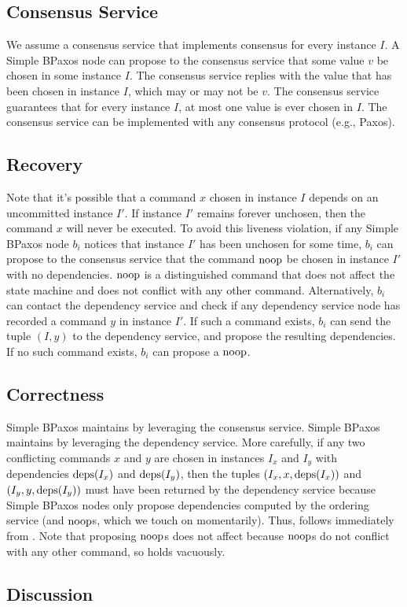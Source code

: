 \subsection{Consensus Service}
We assume a consensus service that implements consensus for every instance $I$.
A Simple BPaxos node can propose to the consensus service that some value $v$
be chosen in some instance $I$. The consensus service replies with the value
that has been chosen in instance $I$, which may or may not be $v$. The
consensus service guarantees that for every instance $I$, at most one value is
ever chosen in $I$. The consensus service can be implemented with any consensus
protocol (e.g., Paxos).

\subsection{Recovery}
Note that it's possible that a command $x$ chosen in instance $I$ depends on an
uncommitted instance $I'$. If instance $I'$ remains forever unchosen, then the
command $x$ will never be executed. To avoid this liveness violation, if any
Simple BPaxos node $b_i$ notices that instance $I'$ has been unchosen for some
time, $b_i$ can propose to the consensus service that the command $\text{noop}$ be
chosen in instance $I'$ with no dependencies. $\text{noop}$ is a distinguished
command that does not affect the state machine and does not conflict with any
other command.
%
Alternatively, $b_i$ can contact the dependency service and check if any
dependency service node has recorded a command $y$ in instance $I'$. If such a
command exists, $b_i$ can send the tuple $(I, y)$ to the dependency service,
and propose the resulting dependencies. If no such command exists, $b_i$ can
propose a $\text{noop}$.

\subsection{Correctness}
Simple BPaxos maintains  by leveraging the consensus
service. Simple BPaxos maintains  by leveraging the
dependency service. More carefully, if any two conflicting commands $x$ and $y$
are chosen in instances $I_x$ and $I_y$ with dependencies $\text{deps}(I_x)$ and
$\text{deps}(I_y)$, then the tuples $(I_x, x, \text{deps}(I_x))$ and $(I_y, y, \text{deps}(I_y))$
must have been returned by the dependency service because Simple BPaxos nodes
only propose dependencies computed by the ordering service (and $\text{noop}$s, which
we touch on momentarily). Thus,  follows immediately
from . Note that proposing $\text{noop}{}$s does not
affect  because $\text{noop}$s do not conflict with any
other command, so  holds vacuously.

\subsection{Discussion}
